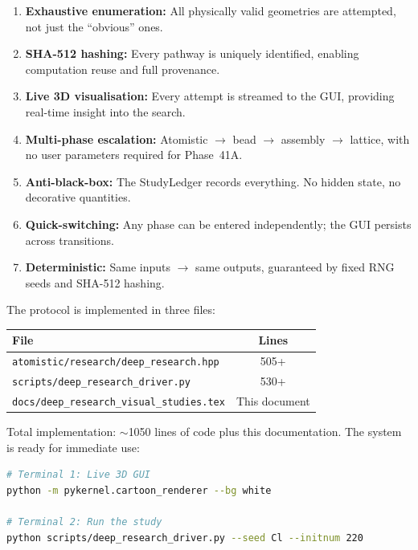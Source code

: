 \documentclass[11pt,a4paper]{article}
\begin{document}
\begin{enumerate}
  \item \textbf{Exhaustive enumeration:}  All physically valid
        geometries are attempted, not just the ``obvious'' ones.
  \item \textbf{SHA-512 hashing:}  Every pathway is uniquely
        identified, enabling computation reuse and full provenance.
  \item \textbf{Live 3D visualisation:}  Every attempt is streamed
        to the GUI, providing real-time insight into the search.
  \item \textbf{Multi-phase escalation:}  Atomistic $\to$ bead
        $\to$ assembly $\to$ lattice, with no user parameters
        required for Phase~41A.
  \item \textbf{Anti-black-box:}  The StudyLedger records everything.
        No hidden state, no decorative quantities.
  \item \textbf{Quick-switching:}  Any phase can be entered
        independently; the GUI persists across transitions.
  \item \textbf{Deterministic:}  Same inputs $\to$ same outputs,
        guaranteed by fixed RNG seeds and SHA-512 hashing.
\end{enumerate}

\noindent The protocol is implemented in three files:

\begin{center}
\begin{tabular}{lc}
\toprule
\textbf{File} & \textbf{Lines} \\
\midrule
\texttt{atomistic/research/deep\_research.hpp}     & 505+ \\
\texttt{scripts/deep\_research\_driver.py}          & 530+ \\
\texttt{docs/deep\_research\_visual\_studies.tex}   & This document \\
\bottomrule
\end{tabular}
\end{center}

\noindent Total implementation: $\sim$1050 lines of code plus this
documentation.  The system is ready for immediate use:

\begin{lstlisting}[language=bash,title={\textbf{Start a deep research study now}}]
# Terminal 1: Live 3D GUI
python -m pykernel.cartoon_renderer --bg white

# Terminal 2: Run the study
python scripts/deep_research_driver.py --seed Cl --initnum 220
\end{lstlisting}
\end{document}
